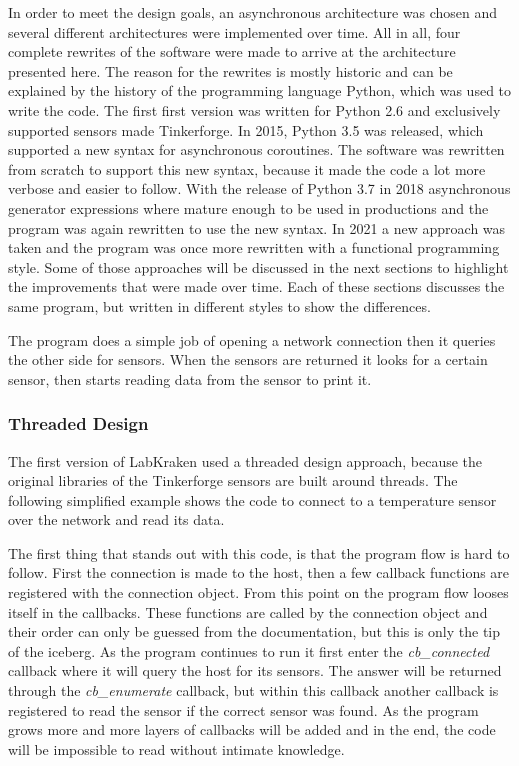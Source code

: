 In order to meet the design goals, an asynchronous architecture was chosen and several different architectures were implemented over time. All in all, four complete rewrites of the software were made to arrive at the architecture presented here. The reason for the rewrites is mostly historic and can be explained by the history of the programming language Python, which was used to write the code. The first first version was written for Python 2.6 and exclusively supported sensors made Tinkerforge. In 2015, Python 3.5 was released, which supported a new syntax for asynchronous coroutines. The software was rewritten from scratch to support this new syntax, because it made the code a lot more verbose and easier to follow. With the release of Python 3.7 in 2018 asynchronous generator expressions where mature enough to be used in productions and the program was again rewritten to use the new syntax. In 2021 a new approach was taken and the program was once more rewritten with a functional programming style. Some of those approaches will be discussed in the next sections to highlight the improvements that were made over time. Each of these sections discusses the same program, but written in different styles to show the differences.

The program does a simple job of opening a network connection then it queries the other side for sensors. When the sensors are returned it looks for a certain sensor, then starts reading data from the sensor to print it.

\subsubsection{Threaded Design}
The first version of LabKraken used a threaded design approach, because the original libraries of the Tinkerforge sensors are built around threads. The following simplified example shows the code to connect to a temperature sensor over the network and read its data.


The first thing that stands out with this code, is that the program flow is hard to follow. First the connection is made to the host, then a few callback functions are registered with the connection object. From this point on the program flow looses itself in the callbacks. These functions are called by the connection object and their order can only be guessed from the documentation, but this is only the tip of the iceberg. As the program continues to run it first enter the \textit{cb\_connected} callback where it will query the host for its sensors. The answer will be returned through the \textit{cb\_enumerate} callback, but within this callback another callback is registered to read the sensor if the correct sensor was found. As the program grows more and more layers of callbacks will be added and in the end, the code will be impossible to read without intimate knowledge.


